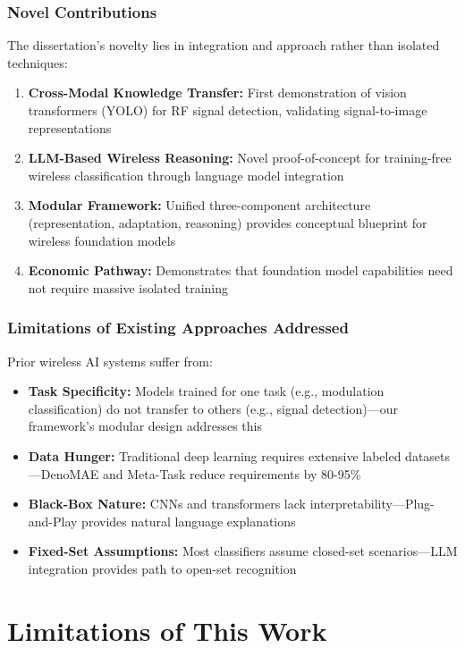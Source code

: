 \subsubsection{Novel Contributions}

The dissertation's novelty lies in integration and approach rather than isolated techniques:

\begin{enumerate}
    \item \textbf{Cross-Modal Knowledge Transfer:} First demonstration of vision transformers (YOLO) for RF signal detection, validating signal-to-image representations
    \item \textbf{LLM-Based Wireless Reasoning:} Novel proof-of-concept for training-free wireless classification through language model integration
    \item \textbf{Modular Framework:} Unified three-component architecture (representation, adaptation, reasoning) provides conceptual blueprint for wireless foundation models
    \item \textbf{Economic Pathway:} Demonstrates that foundation model capabilities need not require massive isolated training
\end{enumerate}

\subsubsection{Limitations of Existing Approaches Addressed}

Prior wireless AI systems suffer from:
\begin{itemize}
    \item \textbf{Task Specificity:} Models trained for one task (e.g., modulation classification) do not transfer to others (e.g., signal detection)—our framework's modular design addresses this
    \item \textbf{Data Hunger:} Traditional deep learning requires extensive labeled datasets—DenoMAE and Meta-Task reduce requirements by 80-95\%
    \item \textbf{Black-Box Nature:} CNNs and transformers lack interpretability—Plug-and-Play provides natural language explanations
    \item \textbf{Fixed-Set Assumptions:} Most classifiers assume closed-set scenarios—LLM integration provides path to open-set recognition
\end{itemize}

\section{Limitations of This Work}

